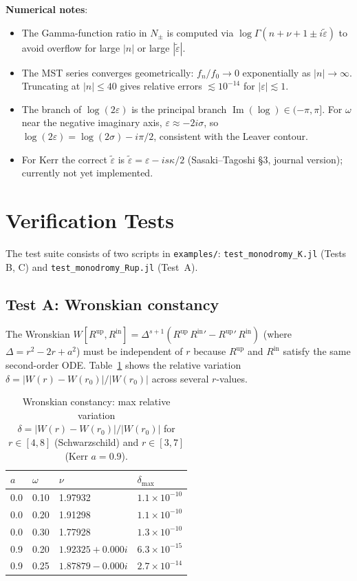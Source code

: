 \documentclass[12pt,a4paper]{article}
\newcommand{\Rup}{R^{\mathrm{up}}}
\newcommand{\Rin}{R^{\mathrm{in}}}
\newcommand{\epst}{\tilde{\varepsilon}}
\begin{document}
\noindent
\textbf{Numerical notes}:
\begin{itemize}
  \item The Gamma-function ratio in $N_\pm$ is computed via
    $\log\Gamma(n+\nu+1\pm i\epst)$ to avoid overflow for large $|n|$ or
    large $|\epst|$.
  \item The MST series converges geometrically: $f_n/f_0 \to 0$ exponentially
    as $|n| \to \infty$.  Truncating at $|n| \le 40$ gives relative errors
    $\lesssim 10^{-14}$ for $|\varepsilon| \lesssim 1$.
  \item The branch of $\log(2\varepsilon)$ is the principal branch
    $\operatorname{Im}(\log) \in (-\pi,\pi]$.  For $\omega$ near the negative
    imaginary axis, $\varepsilon \approx -2i\sigma$, so
    $\log(2\varepsilon) = \log(2\sigma) - i\pi/2$, consistent with the
    Leaver contour.
  \item For Kerr the correct $\epst$ is $\epst = \varepsilon - is\kappa/2$
    (Sasaki--Tagoshi \S3, journal version); currently not yet implemented.
\end{itemize}

\section{Verification Tests}

The test suite consists of two scripts in \texttt{examples/}:
\texttt{test\_monodromy\_K.jl} (Tests B, C) and
\texttt{test\_monodromy\_Rup.jl} (Test~A).

\subsection{Test A: Wronskian constancy}

The Wronskian $W[\Rup, \Rin] = \Delta^{s+1}(\Rup\,{\Rin}' - {\Rup}'\,\Rin)$
(where $\Delta = r^2 - 2r + a^2$)
must be independent of $r$ because $\Rup$ and $\Rin$ satisfy the same
second-order ODE.  Table~\ref{tab:wronskian} shows the relative variation
$\delta = |W(r) - W(r_0)|/|W(r_0)|$ across several $r$-values.

\begin{table}[ht]
\centering
\caption{Wronskian constancy: max relative variation $\delta = |W(r)-W(r_0)|/|W(r_0)|$
for $r \in [4,8]$ (Schwarzschild) and $r \in [3,7]$ (Kerr $a=0.9$).}
\label{tab:wronskian}
\begin{tabular}{llll}
\toprule
$a$ & $\omega$ & $\nu$ & $\delta_{\max}$ \\
\midrule
0.0 & 0.10 & 1.97932 & $1.1 \times 10^{-10}$ \\
0.0 & 0.20 & 1.91298 & $1.1 \times 10^{-10}$ \\
0.0 & 0.30 & 1.77928 & $1.3 \times 10^{-10}$ \\
0.9 & 0.20 & $1.92325 + 0.000i$ & $6.3 \times 10^{-15}$ \\
0.9 & 0.25 & $1.87879 - 0.000i$ & $2.7 \times 10^{-14}$ \\
\bottomrule
\end{tabular}
\end{table}
\end{document}
